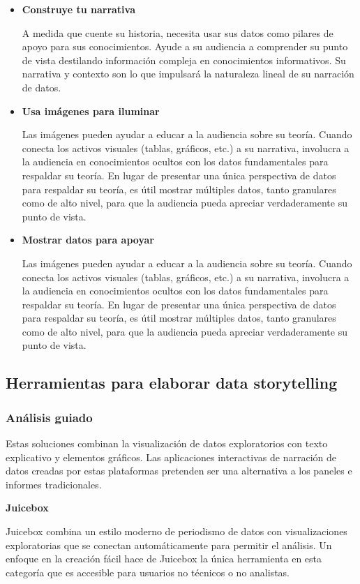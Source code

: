 \documentclass[twoside,twocolumn]{article}
\begin{document}
\begin{itemize}
    \item \textbf{Construye tu narrativa}
    
    A medida que cuente su historia, necesita usar sus datos como pilares de apoyo para sus conocimientos. Ayude a su audiencia a comprender su punto de vista destilando información compleja en conocimientos informativos. Su narrativa y contexto son lo que impulsará la naturaleza lineal de su narración de datos.
    \item \textbf{Usa imágenes para iluminar}
    
    Las imágenes pueden ayudar a educar a la audiencia sobre su teoría. Cuando conecta los activos visuales (tablas, gráficos, etc.) a su narrativa, involucra a la audiencia en conocimientos ocultos con los datos fundamentales para respaldar su teoría. En lugar de presentar una única perspectiva de datos para respaldar su teoría, es útil mostrar múltiples datos, tanto granulares como de alto nivel, para que la audiencia pueda apreciar verdaderamente su punto de vista.
    \item \textbf{Mostrar datos para apoyar}
    
    Las imágenes pueden ayudar a educar a la audiencia sobre su teoría. Cuando conecta los activos visuales (tablas, gráficos, etc.) a su narrativa, involucra a la audiencia en conocimientos ocultos con los datos fundamentales para respaldar su teoría. En lugar de presentar una única perspectiva de datos para respaldar su teoría, es útil mostrar múltiples datos, tanto granulares como de alto nivel, para que la audiencia pueda apreciar verdaderamente su punto de vista.
\end{itemize}
\subsection{Herramientas para elaborar data storytelling}

\subsubsection{Análisis guiado}
Estas soluciones combinan la visualización de datos exploratorios con texto explicativo y elementos gráficos. Las aplicaciones interactivas de narración de datos creadas por estas plataformas pretenden ser una alternativa a los paneles e informes tradicionales.


\textbf{Juicebox}

Juicebox combina un estilo moderno de periodismo de datos con visualizaciones exploratorias que se conectan automáticamente para permitir el análisis. Un enfoque en la creación fácil hace de Juicebox la única herramienta en esta categoría que es accesible para usuarios no técnicos o no analistas.
\end{document}
